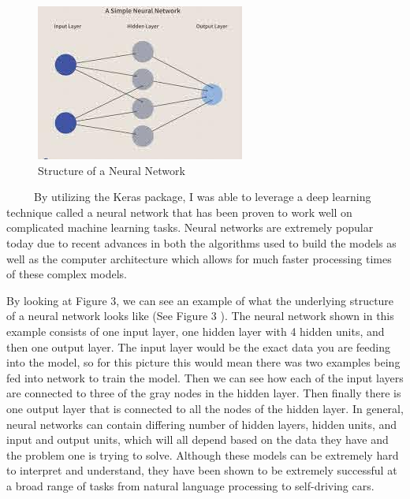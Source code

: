 \documentclass[12pt]{article}
\begin{document}
\begin{figure}

{\centering \includegraphics[width=0.75\linewidth,height=0.25\textheight]{images/neural_net} 

}

\caption{Structure of a Neural Network}\label{fig:sample-fig3}
\end{figure}

~~~~~By utilizing the Keras package, I was able to leverage a deep
learning technique called a neural network that has been proven to work
well on complicated machine learning tasks. Neural networks are
extremely popular today due to recent advances in both the algorithms
used to build the models as well as the computer architecture which
allows for much faster processing times of these complex models.

By looking at Figure 3, we can see an example of what the underlying
structure of a neural network looks like (See Figure 3
\citep{Investopedia}). The neural network shown in this example consists
of one input layer, one hidden layer with 4 hidden units, and then one
output layer. The input layer would be the exact data you are feeding
into the model, so for this picture this would mean there was two
examples being fed into network to train the model. Then we can see how
each of the input layers are connected to three of the gray nodes in the
hidden layer. Then finally there is one output layer that is connected
to all the nodes of the hidden layer. In general, neural networks can
contain differing number of hidden layers, hidden units, and input and
output units, which will all depend based on the data they have and the
problem one is trying to solve. Although these models can be extremely
hard to interpret and understand, they have been shown to be extremely
successful at a broad range of tasks from natural language processing to
self-driving cars.
\end{document}
